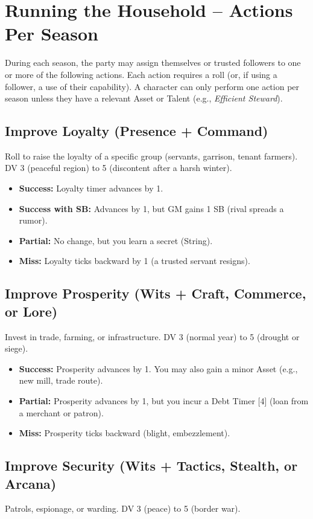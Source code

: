 \documentclass[11pt]{article}
\begin{document}
\section{Running the Household -- Actions Per Season}

During each season, the party may assign themselves or trusted followers to one or more of the following actions. Each action requires a roll (or, if using a follower, a use of their capability). A character can only perform one action per season unless they have a relevant Asset or Talent (e.g., \textit{Efficient Steward}).

\subsection*{Improve Loyalty (Presence + Command)}
Roll to raise the loyalty of a specific group (servants, garrison, tenant farmers). DV 3 (peaceful region) to 5 (discontent after a harsh winter).

\begin{itemize}
    \item \textbf{Success:} Loyalty timer advances by 1.
    \item \textbf{Success with SB:} Advances by 1, but GM gains 1 SB (rival spreads a rumor).
    \item \textbf{Partial:} No change, but you learn a secret (String).
    \item \textbf{Miss:} Loyalty ticks backward by 1 (a trusted servant resigns).
\end{itemize}

\subsection*{Improve Prosperity (Wits + Craft, Commerce, or Lore)}
Invest in trade, farming, or infrastructure. DV 3 (normal year) to 5 (drought or siege).

\begin{itemize}
    \item \textbf{Success:} Prosperity advances by 1. You may also gain a minor Asset (e.g., new mill, trade route).
    \item \textbf{Partial:} Prosperity advances by 1, but you incur a Debt Timer [4] (loan from a merchant or patron).
    \item \textbf{Miss:} Prosperity ticks backward (blight, embezzlement).
\end{itemize}

\subsection*{Improve Security (Wits + Tactics, Stealth, or Arcana)}
Patrols, espionage, or warding. DV 3 (peace) to 5 (border war).
\end{document}
